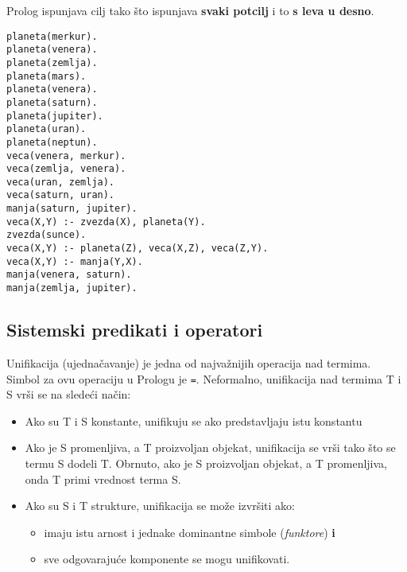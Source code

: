 \documentclass[../main.tex]{subfiles}
\begin{document}
Prolog ispunjava cilj tako što ispunjava {\bf svaki potcilj} i to {\bf s leva u desno}.

\begin{boxprimer}
\begin{example}
\begin{multicols}{2}
\begin{Verbatim}
planeta(merkur).
planeta(venera).
planeta(zemlja).
planeta(mars).
planeta(venera).
planeta(saturn).
planeta(jupiter).
planeta(uran).
planeta(neptun).
veca(venera, merkur).
veca(zemlja, venera).
veca(uran, zemlja).
veca(saturn, uran).
manja(saturn, jupiter).
veca(X,Y) :- zvezda(X), planeta(Y).
zvezda(sunce).
veca(X,Y) :- planeta(Z), veca(X,Z), veca(Z,Y).
veca(X,Y) :- manja(Y,X).
manja(venera, saturn).
manja(zemlja, jupiter).
\end{Verbatim}
\end{multicols}
\end{example}
\end{boxprimer}

\subsection{Sistemski predikati i operatori}

Unifikacija (ujednačavanje) je jedna od najvažnijih operacija nad termima. Simbol za ovu operaciju u Prologu je \texttt{=}. Neformalno, unifikacija nad termima T i S vrši se na sledeći način:
\begin{itemize}
\item Ako su T i S konstante, unifikuju se ako predstavljaju istu konstantu
\item Ako je S promenljiva, a T proizvoljan objekat, unifikacija se vrši tako što se termu S dodeli T. Obrnuto, ako je S proizvoljan objekat, a T promenljiva, onda  T primi vrednost terma S.
\item Ako su S i T strukture, unifikacija se može izvršiti ako:
	\begin{itemize}
	\item imaju istu arnost i jednake dominantne simbole ({\it funktore}) {\bf i}
	\item sve odgovarajuće komponente se mogu unifikovati.
	\end{itemize}
\end{itemize}
\end{document}
